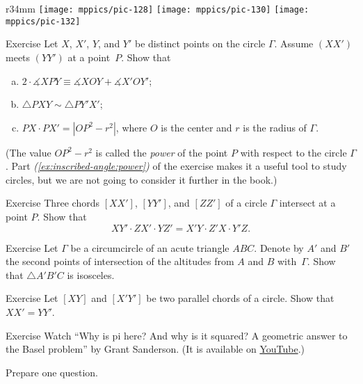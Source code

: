 {

\begin{wrapfigure}{r}{34mm}
\centering
\texttt{[image: mppics/pic-128]}
\vskip3mm
\texttt{[image: mppics/pic-130]}
\vskip3mm
\texttt{[image: mppics/pic-132]}
\end{wrapfigure}

\begin{thm}{Exercise}\label{ex:inscribed-angle}
Let $X$, $X'$, $Y$, and $Y'$ be distinct points on the circle $\Gamma$.
Assume $(XX')$ meets $(YY')$ at a point~$P$.
Show that 
\begin{enumerate}[(a)]
\item $2\cdot \measuredangle XPY\equiv\measuredangle XOY+\measuredangle X'OY'$;
\item\label{ex:inscribed-angle:b} $\triangle PXY\sim \triangle PY'X'$;
\item\label{ex:inscribed-angle:power} $PX\cdot PX'=|OP^2-r^2|$, where $O$ is the center and $r$ is the radius of $\Gamma$.
\end{enumerate}

\end{thm}

(The value $OP^2-r^2$ is called the \emph{power} of the point $P$ with respect to the circle $\Gamma$. 
Part \textit{(\ref{ex:inscribed-angle:power})} of the exercise makes it a useful tool to study circles, but we are not going to consider it further in the book.) 

\begin{thm}{Exercise}\label{ex:inscribed-hex}
Three chords $[XX']$, $[YY']$, and $[ZZ']$
of a circle $\Gamma$ intersect at a point $P$.
Show that 
$$XY'\cdot ZX'\cdot YZ'=X'Y\cdot Z'X\cdot Y'Z.$$

\end{thm}

\begin{thm}{Exercise}\label{ex:altitudes-circumcircle}
Let $\Gamma$ be a circumcircle of an acute triangle $A B C$.
Denote by $A'$ and $B'$ the second points of intersection of the altitudes from $A$ and $B$ with~$\Gamma$.
Show that $\triangle A' B' C$ is isosceles.
\end{thm}

\begin{thm}{Exercise}\label{ex:two-chords}
Let $[XY]$ and $[X'Y']$
 be two parallel chords of a circle.
Show that $XX'=YY'$.
\end{thm}

}

\begin{thm}{Exercise}
Watch ``Why is pi here? And why is it squared? A geometric answer to the Basel problem'' by Grant Sanderson. (It is available on \href{https://youtu.be/d-o3eB9sfls}{YouTube}.) 

Prepare one question.
\end{thm}

